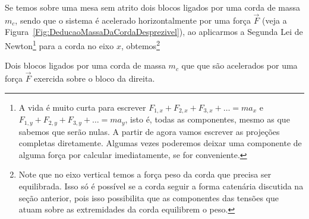 Se temos sobre uma mesa sem atrito dois blocos ligados por uma corda de massa $m_c$, sendo que o sistema é acelerado horizontalmente por uma força $\vec{F}$ (veja a Figura~\ref{Fig:DeducaoMassaDaCordaDesprezivel}), ao aplicarmos a Segunda Lei de Newton\footnote[][-3cm]{A vida é muito curta para escrever $F_{1, x} + F_{2, x} + F_{3, x} + \dots = m a_x$ e $F_{1, y} + F_{2, y} + F_{3, y} + \dots = m a_y$, isto é, todas as componentes, mesmo as que sabemos que serão nulas. A partir de agora vamos escrever as projeções completas diretamente. Algumas vezes poderemos deixar uma componente de alguma força por calcular imediatamente, se for conveniente.}  para a corda no eixo $x$, obtemos\footnote{Note que no eixo vertical temos a força peso da corda que precisa ser equilibrada. Isso só é possível se a corda seguir a forma catenária discutida na seção anterior, pois isso possibilita que as componentes das tensões que atuam sobre as extremidades da corda equilibrem o peso.}
\begin{marginfigure}[1cm]
\centering
{}
\caption{Dois blocos ligados por uma corda de massa $m_c$ que que são acelerados por uma força $\vec{F}$ exercida sobre o bloco da direita.\label{Fig:DeducaoMassaDaCordaDesprezivel}}
\end{marginfigure}
